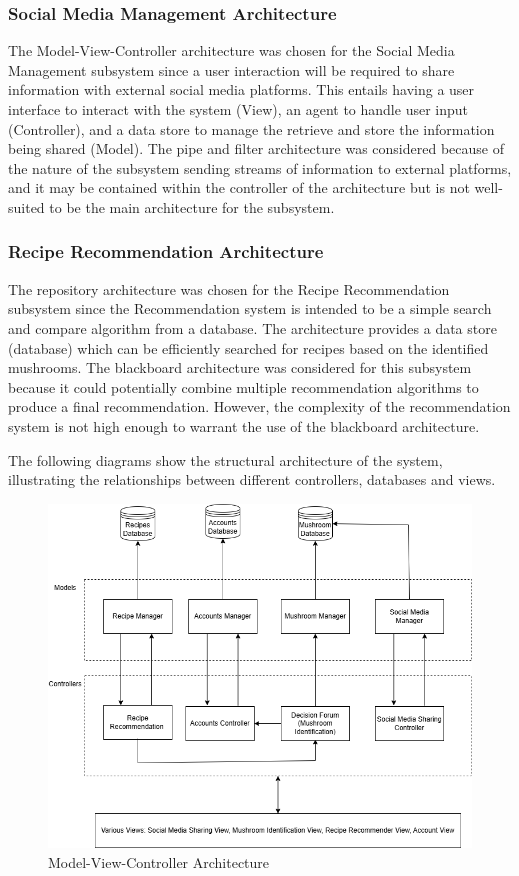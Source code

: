 \documentclass[]{article}
\begin{document}
\subsubsection{Social Media Management Architecture}

The Model-View-Controller architecture was chosen for the Social Media Management subsystem since 
a user interaction will be required to share information with external social media platforms. This entails
having a user interface to interact with the system (View), an agent to handle user input (Controller), and 
a data store to manage the retrieve and store the information being shared (Model). The pipe and filter
architecture was considered because of the nature of the subsystem sending streams of information to 
external platforms, and it may be contained within the controller of the architecture but is not well-suited
to be the main architecture for the subsystem.

\subsubsection{Recipe Recommendation Architecture}

The repository architecture was chosen for the Recipe Recommendation subsystem since the Recommendation
system is intended to be a simple search and compare algorithm from a database. The architecture provides
a data store (database) which can be efficiently searched for recipes based on the identified mushrooms.
The blackboard architecture was considered for this subsystem because it could potentially combine multiple 
recommendation algorithms to produce a final recommendation. However, the complexity of the recommendation
system is not high enough to warrant the use of the blackboard architecture.

\newpage
The following diagrams show the structural architecture of the system, illustrating the 
relationships between different controllers, databases and views.

\begin{figure}[H]
	\centering
	\includegraphics[width=1\textwidth]{sysarch.png}
	\caption{Model-View-Controller Architecture}
	\label{fig:sys-arch}
\end{figure}
\end{document}
